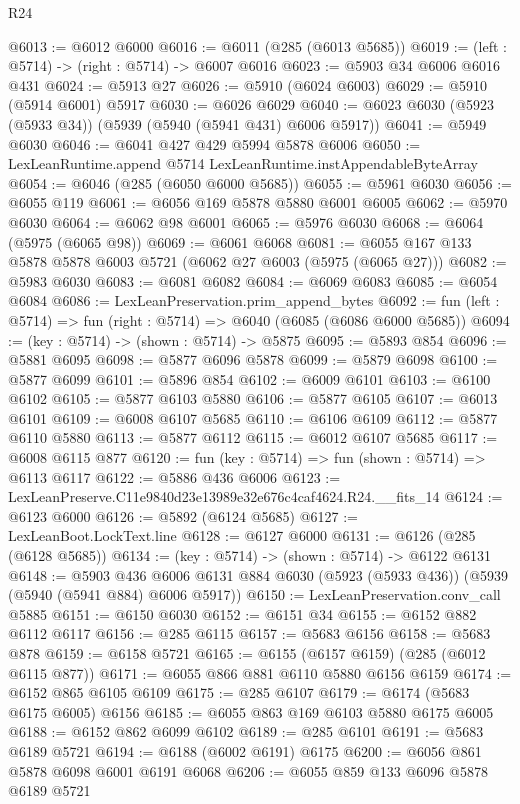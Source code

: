 \begin{lexlean}{R24}
\begin{coremodule}
@6013 := @6012 @6000
@6016 := @6011 (@285 (@6013 @5685))
@6019 := (left : @5714) -> (right : @5714) -> @6007 @6016
@6023 := @5903 @34 @6006 @6016 @431
@6024 := @5913 @27
@6026 := @5910 (@6024 @6003)
@6029 := @5910 (@5914 @6001) @5917
@6030 := @6026 @6029
@6040 := @6023 @6030 (@5923 (@5933 @34)) (@5939 (@5940 (@5941 @431) @6006 @5917))
@6041 := @5949 @6030
@6046 := @6041 @427 @429 @5994 @5878 @6006
@6050 := LexLeanRuntime.append @5714 LexLeanRuntime.instAppendableByteArray
@6054 := @6046 (@285 (@6050 @6000 @5685))
@6055 := @5961 @6030
@6056 := @6055 @119
@6061 := @6056 @169 @5878 @5880 @6001 @6005
@6062 := @5970 @6030
@6064 := @6062 @98 @6001
@6065 := @5976 @6030
@6068 := @6064 (@5975 (@6065 @98))
@6069 := @6061 @6068
@6081 := @6055 @167 @133 @5878 @5878 @6003 @5721 (@6062 @27 @6003 (@5975 (@6065 @27)))
@6082 := @5983 @6030
@6083 := @6081 @6082
@6084 := @6069 @6083
@6085 := @6054 @6084
@6086 := LexLeanPreservation.prim_append_bytes
@6092 := fun (left : @5714) => fun (right : @5714) => @6040 (@6085 (@6086 @6000 @5685))
@6094 := (key : @5714) -> (shown : @5714) -> @5875
@6095 := @5893 @854
@6096 := @5881 @6095
@6098 := @5877 @6096 @5878
@6099 := @5879 @6098
@6100 := @5877 @6099
@6101 := @5896 @854
@6102 := @6009 @6101
@6103 := @6100 @6102
@6105 := @5877 @6103 @5880
@6106 := @5877 @6105
@6107 := @6013 @6101
@6109 := @6008 @6107 @5685
@6110 := @6106 @6109
@6112 := @5877 @6110 @5880
@6113 := @5877 @6112
@6115 := @6012 @6107 @5685
@6117 := @6008 @6115 @877
@6120 := fun (key : @5714) => fun (shown : @5714) => @6113 @6117
@6122 := @5886 @436 @6006
@6123 := LexLeanPreserve.C11e9840d23e13989e32e676c4caf4624.R24.__fits_14
@6124 := @6123 @6000
@6126 := @5892 (@6124 @5685)
@6127 := LexLeanBoot.LockText.line
@6128 := @6127 @6000
@6131 := @6126 (@285 (@6128 @5685))
@6134 := (key : @5714) -> (shown : @5714) -> @6122 @6131
@6148 := @5903
    @436
    @6006
    @6131
    @884
    @6030
    (@5923 (@5933 @436))
    (@5939 (@5940 (@5941 @884) @6006 @5917))
@6150 := LexLeanPreservation.conv_call @5885
@6151 := @6150 @6030
@6152 := @6151 @34
@6155 := @6152 @882 @6112 @6117
@6156 := @285 @6115
@6157 := @5683 @6156
@6158 := @5683 @878
@6159 := @6158 @5721
@6165 := @6155 (@6157 @6159) (@285 (@6012 @6115 @877))
@6171 := @6055 @866 @881 @6110 @5880 @6156 @6159
@6174 := @6152 @865 @6105 @6109
@6175 := @285 @6107
@6179 := @6174 (@5683 @6175 @6005) @6156
@6185 := @6055 @863 @169 @6103 @5880 @6175 @6005
@6188 := @6152 @862 @6099 @6102
@6189 := @285 @6101
@6191 := @5683 @6189 @5721
@6194 := @6188 (@6002 @6191) @6175
@6200 := @6056 @861 @5878 @6098 @6001 @6191 @6068
@6206 := @6055 @859 @133 @6096 @5878 @6189 @5721

\end{coremodule}
\end{lexlean}
